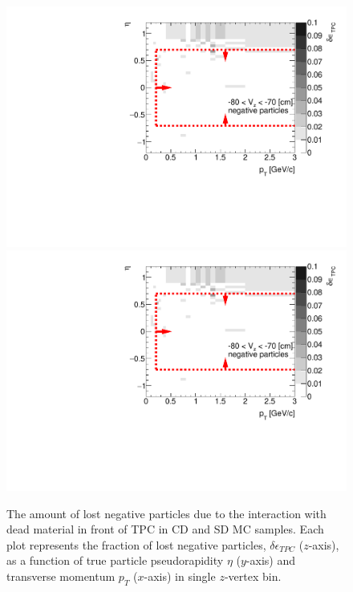 \begin{figure}[H]
	\caption[The amount of lost negative particles due to the interaction with dead material in front of TPC as a function of $p_T$, $\eta$ and $z$-vertex in CD and SD]{The amount of lost negative particles due to the interaction with dead material in front of TPC in CD and SD MC samples. Each plot represents the fraction of lost negative particles, $\delta\epsilon_{ TPC}$ ($z$-axis), as a function of true particle pseudorapidity $\eta$ ($y$-axis) and transverse momentum $p_{T}$ ($x$-axis) in single $z$-vertex bin.}\label{fig:dead_materialCDSD3Dnegative}
	\parbox{0.325\textwidth}{
		\includegraphics[width=\linewidth,page=1]{graphics/systematicsEfficiency/deadMaterial/secondaries_Unbinned_Charged_SDCD.pdf}\\
		\includegraphics[width=\linewidth,page=4]{graphics/systematicsEfficiency/deadMaterial/secondaries_Unbinned_Charged_SDCD.pdf}\\
}
\end{figure}
